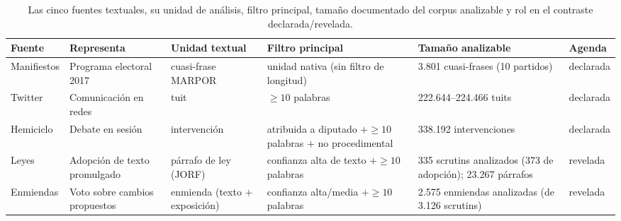 \begin{table}[H]
\centering
\caption{Las cinco fuentes textuales, su unidad de análisis, filtro principal,
tamaño documentado del corpus analizable y rol en el contraste declarada/revelada.}
\label{tab:corpus-resumen}
\footnotesize
\setlength{\tabcolsep}{4pt}
\renewcommand{\arraystretch}{1.15}
\begin{tabularx}{\textwidth}{@{}l Y Y Y Y l@{}}
\toprule
\textbf{Fuente} & \textbf{Representa} & \textbf{Unidad textual} & \textbf{Filtro principal} & \textbf{Tamaño analizable} & \textbf{Agenda} \\
\midrule
Manifiestos & Programa electoral 2017 & cuasi-frase MARPOR & unidad nativa (sin filtro de longitud) & 3.801 cuasi-frases (10 partidos) & declarada \\
Twitter & Comunicación en redes & tuit & $\geq 10$ palabras & 222.644--224.466 tuits & declarada \\
Hemiciclo & Debate en sesión & intervención & atribuida a diputado $+\geq 10$ palabras $+$ no procedimental & 338.192 intervenciones & declarada \\
Leyes & Adopción de texto promulgado & párrafo de ley (JORF) & confianza alta de texto $+\geq 10$ palabras & 335 scrutins analizados (373 de adopción); 23.267 párrafos & revelada \\
Enmiendas & Voto sobre cambios propuestos & enmienda (texto $+$ exposición) & confianza alta/media $+\geq 10$ palabras & 2.575 enmiendas analizadas (de 3.126 scrutins) & revelada \\
\bottomrule
\end{tabularx}
\end{table}

